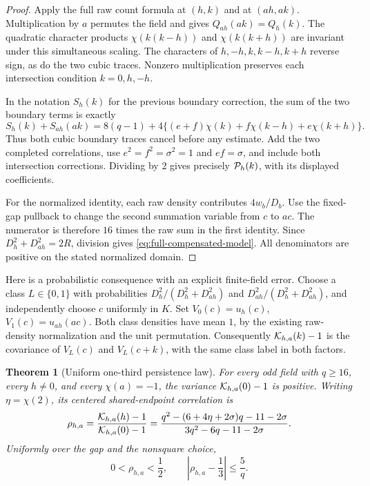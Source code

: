 \documentclass[11pt]{article}
\newtheorem{theorem}{Theorem}[section]
\begin{document}
\begin{proof}
Apply the full raw count formula at \((h,k)\) and at \((ah,ak)\).
Multiplication by \(a\) permutes the field and gives
\(Q_{ah}(ak)=Q_h(k)\). The quadratic character products
\(\chi(k(k-h))\) and \(\chi(k(k+h))\) are invariant under this
simultaneous scaling. The characters of \(h,-h,k,k-h,k+h\) reverse sign,
as do the two cubic traces. Nonzero multiplication preserves each
intersection condition \(k=0,h,-h\).

In the notation \(S_h(k)\) for the previous boundary correction,
the sum of the two boundary terms is exactly
\[
 S_h(k)+S_{ah}(ak)=8(q-1)+
 4\{(e+f)\chi(k)+f\chi(k-h)+e\chi(k+h)\}.
\]
Thus both cubic boundary traces cancel before any estimate. Add the two
completed correlations, use \(e^2=f^2=\sigma^2=1\) and \(ef=\sigma\),
and include both intersection corrections. Dividing by \(2\) gives
precisely \({\cal P}_h(k)\), with its displayed coefficients.

For the normalized identity, each raw density contributes \(4w_b/D_b\).
Use the fixed-gap pullback to change the second summation variable
from \(c\) to \(ac\). The numerator is therefore \(16\) times the raw
sum in the first identity. Since \(D_h^2+D_{ah}^2=2R\), division gives
\eqref{eq:full-compensated-model}. All denominators are positive on the
stated normalized domain.
\end{proof}

Here is a probabilistic consequence with an explicit finite-field error.
Choose a class \(L\in\{0,1\}\) with probabilities
\(D_h^2/(D_h^2+D_{ah}^2)\) and \(D_{ah}^2/(D_h^2+D_{ah}^2)\),
and independently choose \(c\) uniformly in \(K\).
Set \(V_0(c)=u_h(c)\), \(V_1(c)=u_{ah}(ac)\).
Both class densities have mean \(1\), by the existing raw-density
normalization and the unit permutation. Consequently
\({\cal K}_{h,a}(k)-1\) is the covariance of \(V_L(c)\) and
\(V_L(c+k)\), with the same class label in both factors.

\begin{theorem}[Uniform one-third persistence law]
For every odd field with \(q\ge16\), every \(h\ne0\), and
every \(\chi(a)=-1\), the variance \({\cal K}_{h,a}(0)-1\) is positive.
Writing \(\eta=\chi(2)\), its centered shared-endpoint correlation is
\begin{equation}
 \rho_{h,a}
 =\frac{{\cal K}_{h,a}(h)-1}{{\cal K}_{h,a}(0)-1}
 =\frac{q^2-(6+4\eta+2\sigma)q-11-2\sigma}
        {3q^2-6q-11-2\sigma}.
 \label{eq:one-third-persistence}
\end{equation}
Uniformly over the gap and the nonsquare choice,
\[
 0<\rho_{h,a}<\frac12,\qquad
 \left|\rho_{h,a}-\frac13\right|\le\frac5q.
\]
\end{theorem}
\end{document}
